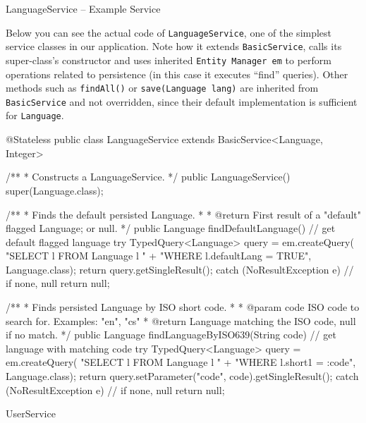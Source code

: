 \enditems

\secc LanguageService -- Example Service

Below you can see the actual code of {\tt LanguageService}, one of the simplest service classes in our application. Note how it extends {\tt BasicService}, calls its super-class’s constructor and uses inherited {\tt Entity Manager em} to perform operations related to persistence (in this case it executes “find” queries). Other methods such as {\tt findAll()} or {\tt save(Language lang)} are inherited from {\tt BasicService} and not overridden, since their default implementation is sufficient for {\tt Language}.

\vfil \break

\begtt

@Stateless
public class LanguageService extends BasicService<Language, Integer> {

    /**
     * Constructs a LanguageService.
     */
    public LanguageService() {
        super(Language.class);
    }
    
    /**
     * Finds the default persisted Language.
     *
     * @return First result of a "default" flagged Language; or null.
     */
    public Language findDefaultLanguage() {
        // get default flagged language
        try {
            TypedQuery<Language> query = em.createQuery(
                    "SELECT l FROM Language l "
                            + "WHERE l.defaultLang = TRUE",
                    Language.class);
            return query.getSingleResult();
        } catch (NoResultException e) {
            // if none, null
            return null;
        }
    }
    
    /**
     * Finds persisted Language by ISO short code.
     *
     * @param code ISO code to search for. Examples: "en", "cs"
     * @return Language matching the ISO code, null if no match.
     */
    public Language findLanguageByISO639(String code) {
        // get language with matching code
        try {
            TypedQuery<Language> query = em.createQuery(
                    "SELECT l FROM Language l "
                            + "WHERE l.short1 = :code",
                    Language.class);
            return query.setParameter("code", code).getSingleResult();
        } catch (NoResultException e) {
            // if none, null
            return null;
        }
    }
}
\endtt

\vfil \break

\secc UserService

\begitems

